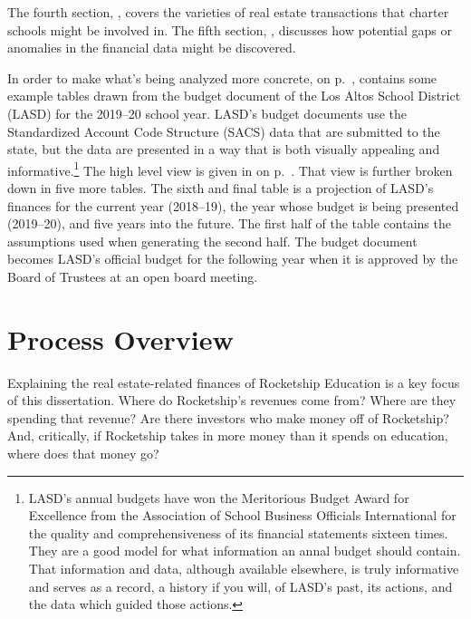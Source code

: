 The fourth section, , covers the varieties of real estate transactions that charter schools might be involved in. The fifth section, , discusses how potential gaps or anomalies in the financial data might be discovered. 

 In order to make what's being analyzed more concrete,  on p.~\pageref{appx:ca-school-financing}, contains some example tables drawn from the budget document of the Los Altos School District (LASD) for the 2019–20 school year. LASD's budget documents use the Standardized Account Code Structure (SACS) data that are submitted to the state, but the data are presented in a way that is both visually appealing and informative.\footnote{LASD's annual budgets have won the Meritorious Budget Award for Excellence from the Association of School Business Officials International for the quality and comprehensiveness of its financial statements sixteen times. They are a good model for what information an annal budget should contain. That information and data, although available elsewhere, is truly informative and serves as a record, a history if you will, of LASD's past, its actions, and the data which guided those actions.}
The high level view is given in  on p.~\pageref{fig:LASD_All_Funds_Summary}. That view is further broken down in five more tables. The sixth and final table is a projection of LASD's finances for the current year (2018–19), the year whose budget is being presented (2019–20), and five years into the future. The first half of the table contains the assumptions used when generating the second half. The budget document becomes LASD's official budget for the following year when it is approved by the Board of Trustees at an open board meeting. 

\section{Process Overview}\label{sec:process-overview}%

Explaining the real estate-related finances of Rocketship Education is a key focus of this dissertation. Where do Rocketship's revenues come from? Where are they spending that revenue? Are there investors who make money off of Rocketship? And, critically, if Rocketship takes in more money than it spends on education, where does that money go?

